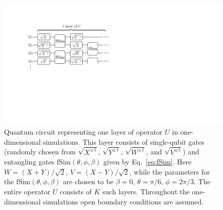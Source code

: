 \documentclass[%
 reprint,
 superscriptaddress,
 amsmath,amssymb,
prx,
]{revtex4-2}\href{\href{}{}}{}
\begin{document}
\begin{figure}[t] 
	\includegraphics[width = 0.8\columnwidth]{setup_circuit_non_integrable.pdf}
	\caption{Quantum circuit representing one layer of operator $U$ in one-dimensional simulations. This layer consists of single-qubit gates (randomly chosen from $\sqrt{X^{\pm1}}$, $\sqrt{Y^{\pm1}}$, $\sqrt{W^{\pm1}}$, and $\sqrt{V^{\pm1}}$) and entangling gates $\text{fSim}(\theta,\phi,\beta)$ given by Eq.~\eqref{eq:fSim}. Here $W=(X+Y)/\sqrt{2}$, $V=(X-Y)/\sqrt{2}$, while the parameters for the $\text{fSim}(\theta,\phi,\beta)$ are chosen to be $\beta=0$, $\theta=\pi/6$, $\phi=2\pi/3$. The entire operator $U$ consists of $K$ such layers. Throughout the one-dimensional simulations open boundary conditions are assumed.
 }
	\label{fig:circuit_nonint}
\end{figure}
\end{document}
